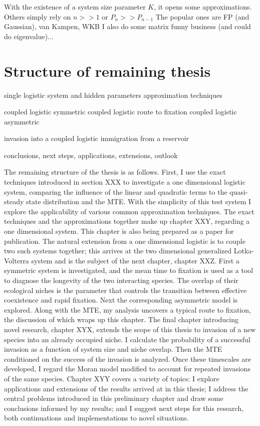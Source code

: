 \documentclass[a4paper,11pt]{article}
\numberwithin{equation}{section} %
\begin{document}
With the existence of a system size parameter $K$, it opens some approximations. 
Others simply rely on $n>>1$ or $P_n>>P_{n-1}$
The popular ones are FP (and Gaussian), van Kampen, WKB
I also do some matrix funny business (and could do eigenvalue)...










\section{Structure of remaining thesis}
single logistic system and hidden parameters
approximation techniques

coupled logistic symmetric
coupled logistic route to fixation
coupled logistic asymmetric

invasion into a coupled logistic
immigration from a reservoir

conclusions, next steps, applications, extensions, outlook


The remaining structure of the thesis is as follows. 
First, I use the exact techniques introduced in section XXX to investigate a one dimensional logistic system, comparing the influence of the linear and quadratic terms to the quasi-steady state distribution and the MTE. 
With the simplicity of this test system I explore the applicability of various common approximation techniques. 
The exact techniques and the approximations together make up chapter XXY, regarding a one dimensional system. 
This chapter is also being prepared as a paper for publication. 
The natural extension from a one dimensional logistic is to couple two such systems together; this arrives at the two dimensional generalized Lotka-Volterra system and is the subject of the next chapter, chapter XXZ. 
First a symmetric system is investigated, and the mean time to fixation is used as a tool to diagnose the longevity of the two interacting species. 
The overlap of their ecological niches is the parameter that controls the transition between effective coexistence and rapid fixation. 
Next the corresponding asymmetric model is explored. 
Along with the MTE, my analysis uncovers a typical route to fixation, the discussion of which wraps up this chapter. 
The final chapter introducing novel research, chapter XYX, extends the scope of this thesis to invasion of a new species into an already occupied niche. 
I calculate the probability of a successful invasion as a function of system size and niche overlap. 
Then the MTE conditioned on the success of the invasion is analyzed. 
Once these timescales are developed, I regard the Moran model modified to account for repeated invasions of the same species. 
Chapter XYY covers a variety of topics: I explore applications and extensions of the results arrived at in this thesis; I address the central problems introduced in this preliminary chapter and draw some conclusions informed by my results; and I suggest next steps for this research, both continuations and implementations to novel situations. 
\end{document}
